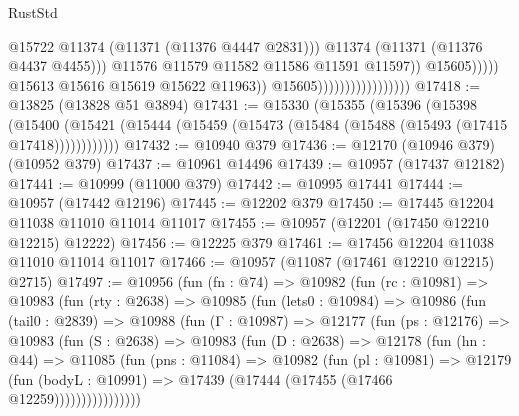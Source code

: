 \begin{lexlean}{RustStd}
\begin{coremodule}
{\begin{coremodule}
{{{{{{{{{{{{{{{{{{{{{{{{{{{{{{{{{                                                            @15722
                                                            @11374
                                                            (@11371 (@11376 @4447 @2831)))
                                                          @11374
                                                          (@11371 (@11376 @4437 @4455)))
                                                        @11576
                                                        @11579
                                                        @11582
                                                        @11586
                                                        @11591
                                                        @11597))
                                                    @15605)))))
                                          @15613
                                          @15616
                                          @15619
                                          @15622
                                          @11963))
                                      @15605)))))))))))))))))
@17418 := @13825 (@13828 @51 @3894)
@17431 := @15330
    (@15355
      (@15396
        (@15398
          (@15400 (@15421 (@15444 (@15459 (@15473 (@15484 (@15488 (@15493 (@17415 @17418))))))))))))
@17432 := @10940 @379
@17436 := @12170 (@10946 @379) (@10952 @379)
@17437 := @10961 @14496
@17439 := @10957 (@17437 @12182)
@17441 := @10999 (@11000 @379)
@17442 := @10995 @17441
@17444 := @10957 (@17442 @12196)
@17445 := @12202 @379
@17450 := @17445 @12204 @11038 @11010 @11014 @11017
@17455 := @10957 (@12201 (@17450 @12210 @12215) @12222)
@17456 := @12225 @379
@17461 := @17456 @12204 @11038 @11010 @11014 @11017
@17466 := @10957 (@11087 (@17461 @12210 @12215) @2715)
@17497 := @10956
    (fun (fn : @74) =>
    @10982
      (fun (rc : @10981) =>
      @10983
        (fun (rty : @2638) =>
        @10985
          (fun (lets0 : @10984) =>
          @10986
            (fun (tail0 : @2839) =>
            @10988
              (fun (Γ : @10987) =>
              @12177
                (fun (ps : @12176) =>
                @10983
                  (fun (S : @2638) =>
                  @10983
                    (fun (D : @2638) =>
                    @12178
                      (fun (hn : @44) =>
                      @11085
                        (fun (pns : @11084) =>
                        @10982
                          (fun (pl : @10981) =>
                          @12179
                            (fun (bodyL : @10991) =>
                            @17439 (@17444 (@17455 (@17466 @12259))))))))))))))))
}}}}}}}}}}}}}}}}}}}}}}}}}}}}}}}}}
\end{coremodule}}
\end{coremodule}
\end{lexlean}
